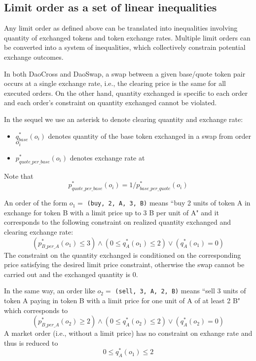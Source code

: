 \documentclass[11pt, reqno]{amsart}
\newcommand{\buy}{\textnormal{\texttt{buy}}}
\begin{document}
\subsection{Limit order as a set of linear inequalities}
Any limit order as defined above can be translated into inequalities involving
quantity of exchanged tokens and token exchange rates. Multiple limit orders
can be converted into a system of inequalities, which collectively constrain
potential exchange outcomes.

In both DaoCross and DaoSwap, a swap between a given base/quote token pair
occurs at a single exchange rate, i.e., the clearing price is the same for
all executed orders. On the other hand, quantity exchanged is specific to
each order and each order's constraint on quantity exchanged cannot be
violated.

In the sequel we use an asterisk to denote clearing quantity and exchange
rate:
\begin{itemize}
    \item $q_{base}^*(o_i)$ denotes quantity of the base token exchanged in a
      swap from order $o_i$
  \item $p_{quote\_per\_base}^*(o_i)$ denotes exchange rate at
\end{itemize}
Note that
\[
    p_{quote\_per\_base}^*(o_i) =
    1 / p_{base\_per\_quote}^*(o_i)
\]

An order of the form $o_1 =$ \texttt{(\buy, 2, A, 3, B)} means ``buy 2 units of
token A in exchange for token B with a limit price up to 3 B per unit of A"
and it corresponds to the following constraint on realized quantity exchanged
and clearing exchange rate:
\begin{equation*}
    (p_{B\_per\_A}^*(o_1) \leq 3) \land
    (0 \le q_{A}^*(o_1) \leq 2) \lor
    (q_A^*(o_1) = 0)
\end{equation*}
The constraint on the quantity exchanged is conditioned on the corresponding
price satisfying the desired limit price constraint, otherwise the swap cannot
be carried out and the exchanged quantity is 0.

In the same way, an order like $o_2 =$ \texttt{(sell, 3, A, 2, B)} means ``sell
3 units of token A paying in token B with a limit price for one unit of A of at
least 2 B" which corresponds to
\begin{equation*}
    (p_{B\_per\_A}^*(o_2) \geq 2) \land
    (0 \le q_{A}^*(o_2) \leq 2) \lor
    (q_A^*(o_2) = 0)
\end{equation*}
A market order (i.e., without a limit price) has no constraint on exhange rate
and thus is reduced to
\[
    0 \le q_{A}^*(o_1) \le 2
\]
\end{document}
